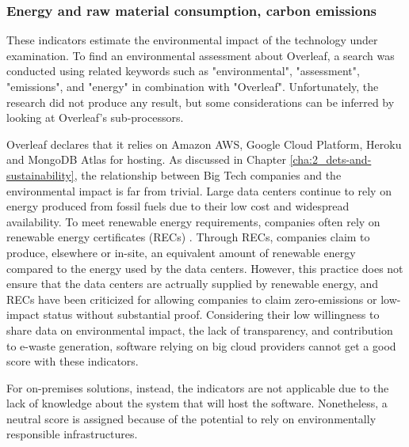 \subsubsection{Energy and raw material consumption, carbon emissions}
These indicators estimate the environmental impact of the technology under examination. To find an environmental assessment about Overleaf, a search was conducted using related keywords such as "environmental", "assessment", "emissions", and "energy" in combination with "Overleaf". Unfortunately, the research did not produce any result, but some considerations can be inferred by looking at Overleaf's sub-processors.

Overleaf declares that it relies on Amazon AWS, Google Cloud Platform, Heroku and MongoDB Atlas for hosting. As discussed in Chapter \ref{cha:2_dets-and-sustainability}, the relationship between Big Tech companies and the environmental impact is far from trivial. Large data centers continue to rely on energy produced from fossil fuels due to their low cost and widespread availability. To meet renewable energy requirements, companies often rely on renewable energy certificates (RECs) \cite{khosravi_review_2024}\cite{stacey_pollution_2025}. Through RECs, companies claim to produce, elsewhere or in-site, an equivalent amount of renewable energy compared to the energy used by the data centers. However, this practice does not ensure that the data centers are actrually supplied by renewable energy, and RECs have been criticized for allowing companies to claim zero-emissions or low-impact status without substantial proof. Considering their low willingness to share data on environmental impact, the lack of transparency, and contribution to e-waste generation, software relying on big cloud providers cannot get a good score with these indicators.

For on-premises solutions, instead, the indicators are not applicable due to the lack of knowledge about the system that will host the software. Nonetheless, a neutral score is assigned because of the potential to rely on environmentally responsible infrastructures. 

